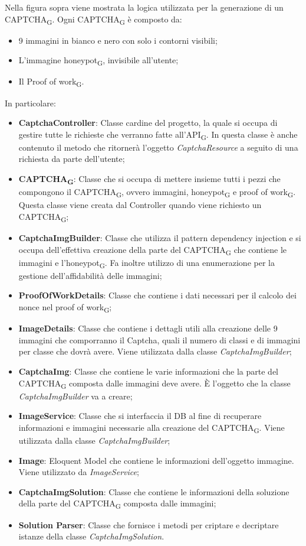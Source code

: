 Nella figura sopra viene mostrata la logica utilizzata per la generazione di un  CAPTCHA\textsubscript{G}.
Ogni CAPTCHA\textsubscript{G} è composto da:
 \begin{itemize}
     \item 9 immagini in bianco e nero con solo i contorni visibili;
     \item L'immagine honeypot\textsubscript{G}, invisibile all'utente;
     \item Il Proof of work\textsubscript{G}.
 \end{itemize}


In particolare:
\begin{itemize}
    \item \textbf{CaptchaController}: Classe cardine del progetto, la quale si occupa di gestire tutte le richieste che verranno fatte all'API\textsubscript{G}. In questa classe è anche contenuto il metodo che ritornerà l'oggetto \textit{CaptchaResource} a seguito di una richiesta da parte dell'utente;
    \item \textbf{CAPTCHA\textsubscript{G}}: Classe che si occupa di mettere insieme tutti i pezzi che compongono il CAPTCHA\textsubscript{G}, ovvero immagini, honeypot\textsubscript{G} e proof of work\textsubscript{G}. Questa classe viene creata dal Controller quando viene richiesto un CAPTCHA\textsubscript{G};
    \item \textbf{CaptchaImgBuilder}: Classe che utilizza il pattern dependency injection e si occupa dell'effettiva creazione della parte del CAPTCHA\textsubscript{G} che contiene le immagini e l'honeypot\textsubscript{G}. Fa inoltre utilizzo di una enumerazione per la gestione dell'affidabilità delle immagini;
    \item \textbf{ProofOfWorkDetails}: Classe che contiene i dati necessari per il calcolo dei nonce nel proof of work\textsubscript{G};
    \item \textbf{ImageDetails}: Classe che contiene i dettagli utili alla creazione delle 9 immagini che comporranno il Captcha, quali il numero di classi e di immagini per classe che dovrà avere. Viene utilizzata dalla classe \textit{CaptchaImgBuilder};
    \item \textbf{CaptchaImg}: Classe che contiene le varie informazioni che la parte del CAPTCHA\textsubscript{G} composta dalle immagini deve avere. È l'oggetto che la classe \textit{CaptchaImgBuilder} va a creare;
    \item \textbf{ImageService}: Classe che si interfaccia il DB al fine di recuperare informazioni e immagini necessarie alla creazione del CAPTCHA\textsubscript{G}. Viene utilizzata dalla classe \textit{CaptchaImgBuilder};
    \item \textbf{Image}: Eloquent Model che contiene le informazioni dell'oggetto immagine. Viene utilizzato da \textit{ImageService};
    \item \textbf{CaptchaImgSolution}: Classe che contiene le informazioni della soluzione della parte del CAPTCHA\textsubscript{G} composta dalle immagini;
    \item \textbf{Solution Parser}: Classe che fornisce i metodi per criptare e decriptare istanze della classe \textit{CaptchaImgSolution}.
\end{itemize}

